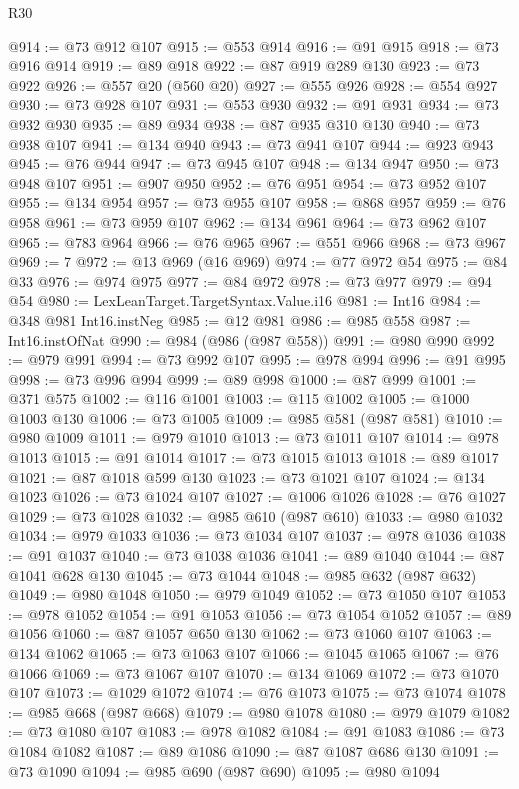 \begin{lexlean}{R30}
\begin{coremodule}
{{{{{@914 := @73 @912 @107
@915 := @553 @914
@916 := @91 @915
@918 := @73 @916 @914
@919 := @89 @918
@922 := @87 @919 @289 @130
@923 := @73 @922
@926 := @557 @20 (@560 @20)
@927 := @555 @926
@928 := @554 @927
@930 := @73 @928 @107
@931 := @553 @930
@932 := @91 @931
@934 := @73 @932 @930
@935 := @89 @934
@938 := @87 @935 @310 @130
@940 := @73 @938 @107
@941 := @134 @940
@943 := @73 @941 @107
@944 := @923 @943
@945 := @76 @944
@947 := @73 @945 @107
@948 := @134 @947
@950 := @73 @948 @107
@951 := @907 @950
@952 := @76 @951
@954 := @73 @952 @107
@955 := @134 @954
@957 := @73 @955 @107
@958 := @868 @957
@959 := @76 @958
@961 := @73 @959 @107
@962 := @134 @961
@964 := @73 @962 @107
@965 := @783 @964
@966 := @76 @965
@967 := @551 @966
@968 := @73 @967
@969 := 7
@972 := @13 @969 (@16 @969)
@974 := @77 @972 @54
@975 := @84 @33
@976 := @974 @975
@977 := @84 @972
@978 := @73 @977
@979 := @94 @54
@980 := LexLeanTarget.TargetSyntax.Value.i16
@981 := Int16
@984 := @348 @981 Int16.instNeg
@985 := @12 @981
@986 := @985 @558
@987 := Int16.instOfNat
@990 := @984 (@986 (@987 @558))
@991 := @980 @990
@992 := @979 @991
@994 := @73 @992 @107
@995 := @978 @994
@996 := @91 @995
@998 := @73 @996 @994
@999 := @89 @998
@1000 := @87 @999
@1001 := @371 @575
@1002 := @116 @1001
@1003 := @115 @1002
@1005 := @1000 @1003 @130
@1006 := @73 @1005
@1009 := @985 @581 (@987 @581)
@1010 := @980 @1009
@1011 := @979 @1010
@1013 := @73 @1011 @107
@1014 := @978 @1013
@1015 := @91 @1014
@1017 := @73 @1015 @1013
@1018 := @89 @1017
@1021 := @87 @1018 @599 @130
@1023 := @73 @1021 @107
@1024 := @134 @1023
@1026 := @73 @1024 @107
@1027 := @1006 @1026
@1028 := @76 @1027
@1029 := @73 @1028
@1032 := @985 @610 (@987 @610)
@1033 := @980 @1032
@1034 := @979 @1033
@1036 := @73 @1034 @107
@1037 := @978 @1036
@1038 := @91 @1037
@1040 := @73 @1038 @1036
@1041 := @89 @1040
@1044 := @87 @1041 @628 @130
@1045 := @73 @1044
@1048 := @985 @632 (@987 @632)
@1049 := @980 @1048
@1050 := @979 @1049
@1052 := @73 @1050 @107
@1053 := @978 @1052
@1054 := @91 @1053
@1056 := @73 @1054 @1052
@1057 := @89 @1056
@1060 := @87 @1057 @650 @130
@1062 := @73 @1060 @107
@1063 := @134 @1062
@1065 := @73 @1063 @107
@1066 := @1045 @1065
@1067 := @76 @1066
@1069 := @73 @1067 @107
@1070 := @134 @1069
@1072 := @73 @1070 @107
@1073 := @1029 @1072
@1074 := @76 @1073
@1075 := @73 @1074
@1078 := @985 @668 (@987 @668)
@1079 := @980 @1078
@1080 := @979 @1079
@1082 := @73 @1080 @107
@1083 := @978 @1082
@1084 := @91 @1083
@1086 := @73 @1084 @1082
@1087 := @89 @1086
@1090 := @87 @1087 @686 @130
@1091 := @73 @1090
@1094 := @985 @690 (@987 @690)
@1095 := @980 @1094
}}}}}
\end{coremodule}
\end{lexlean}
